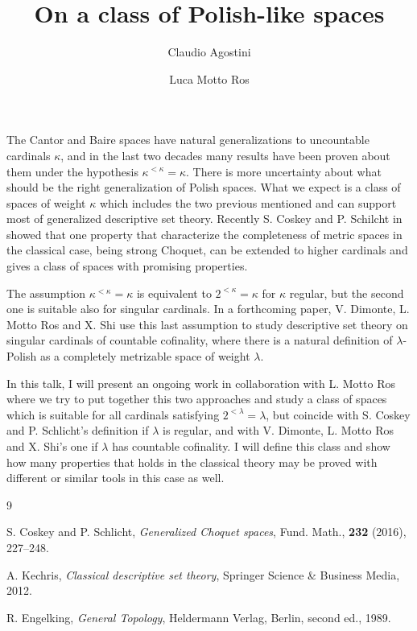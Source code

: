\documentclass{amsart}
\title{On a class of Polish-like spaces}
\author{Claudio Agostini}
\author{Luca Motto Ros}
\begin{document}
\maketitle


The Cantor and Baire spaces have natural generalizations to uncountable cardinals $\kappa$, and in the last two decades many results have been proven about them under the hypothesis $\kappa^{<\kappa}=\kappa$. There is more uncertainty about what should be the right generalization of Polish spaces. What we expect is a class of spaces of weight $\kappa$ which includes the two previous mentioned and can support most of generalized descriptive set theory.
Recently S. Coskey and P. Schilcht in \cite{CosSch} showed that one property that characterize the completeness of metric spaces in the classical case, being strong Choquet, can be extended to higher cardinals and gives a class of spaces with promising properties. 


The assumption $\kappa^{<\kappa}=\kappa$ is equivalent to $2^{<\kappa}=\kappa$ for $\kappa$ regular, but the second one is suitable also for singular cardinals. 
In a forthcoming paper, V. Dimonte, L. Motto Ros and X. Shi use this last assumption to study descriptive set theory on singular cardinals of countable cofinality, where there is a natural definition of $\lambda$-Polish as a completely metrizable space of weight $\lambda$. 

In this talk, I will present an ongoing work in collaboration with L. Motto Ros where we try to put together this two approaches and study a class of spaces which is suitable for all cardinals satisfying $2^{<\lambda}=\lambda$, but coincide with S. Coskey and P. Schlicht's definition if $\lambda$ is regular, and with V. Dimonte, L. Motto Ros and X. Shi's one if $\lambda$ has countable cofinality. I will define this class and show how many properties that holds in the classical theory may be proved with different or similar tools in this case as well.  

\begin{thebibliography} {9}

 S. Coskey and P. Schlicht, \emph{Generalized Choquet spaces}, Fund. Math., \textbf{232} (2016), 227--248.

 A. Kechris, \emph{Classical descriptive set theory}, Springer Science \& Business Media, 2012.
 
 R. Engelking, \emph{General Topology}, Heldermann Verlag, Berlin, second ed., 1989.


 
\end{thebibliography}
\end{document}
